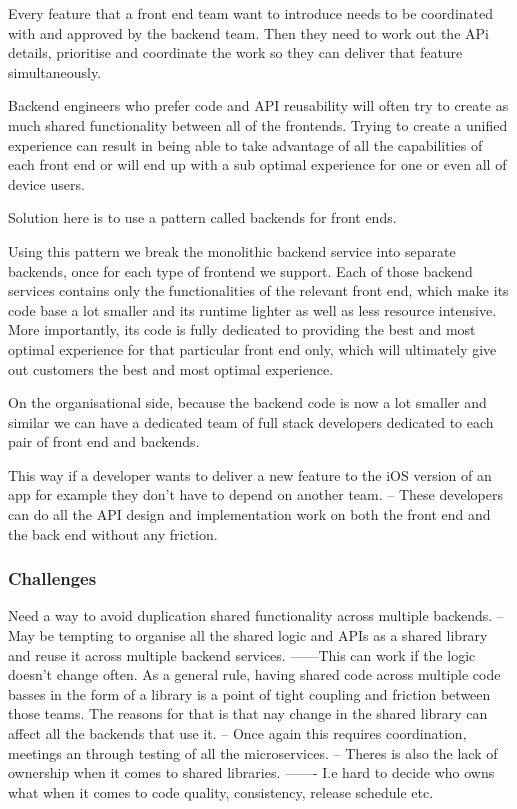 \documentclass[a4paper, 11pt]{book}
\begin{document}
    Every feature that a front end team want to introduce needs to be coordinated with and approved by the backend team.
    Then they need to work out the APi details, prioritise and coordinate the work so they can deliver that feature simultaneously.

    Backend engineers who prefer code and API reusability will often try to create as much shared functionality between all of the frontends.
    Trying to create a unified experience can result in being able to take advantage of all the capabilities of each front end or will end up with a sub optimal experience for one or even all of device users.

    Solution here is to use a pattern called backends for front ends.

    Using this pattern we break the monolithic backend service into separate backends, once for each type of frontend we support.
    Each of those backend services contains only the functionalities of the relevant front end, which make its code base a lot smaller and its runtime lighter as well as less resource intensive.
    More importantly, its code is fully dedicated to providing the best and most optimal experience for that particular front end only, which will ultimately give out customers the best and most optimal experience.

    On the organisational side, because the backend code is now a lot smaller and similar we can have a dedicated team of full stack developers dedicated to each pair of front end and backends.

    This way if a developer wants to deliver a new feature to the iOS version of an app for example they don't have to depend on another team.
    -- These developers can do all the API design and implementation work on both the front end and the back end without any friction.

    \subsubsection{Challenges}
    Need a way to avoid duplication shared functionality across multiple backends.
    -- May be tempting to organise all the shared logic and APIs as a shared library and reuse it across multiple backend services.
    ------This can work if the logic doesn't change often.
    As a general rule, having shared code across multiple code basses in the form of a library is a point of tight coupling and friction between those teams.
    The reasons for that is that nay change in the shared library can affect all the backends that use it.
    -- Once again this requires coordination, meetings an through testing of all the microservices.
    -- Theres is also the lack of ownership when it comes to shared libraries.
    ------- I.e hard to decide who owns what when it comes to code quality, consistency, release schedule etc.
\end{document}
